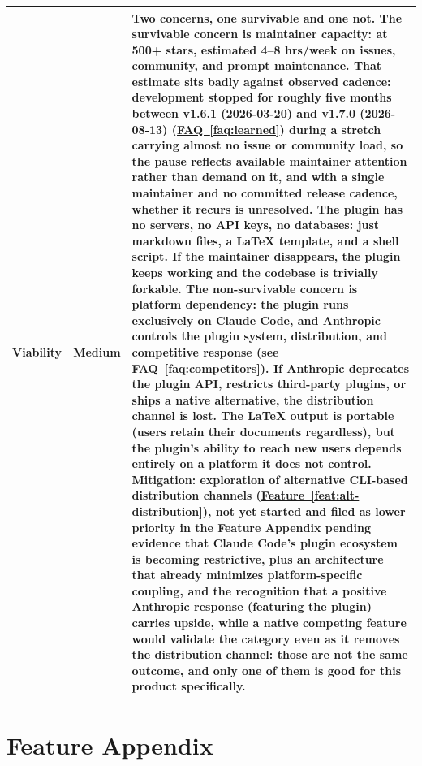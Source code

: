 \documentclass[11pt,letterpaper]{article}
\newcommand{\faqref}[1]{\hyperref[#1]{FAQ~\ref*{#1}}}
\newcommand{\featureref}[1]{\hyperref[#1]{Feature~\ref*{#1}}}
\begin{document}
\begin{tabularx}{\textwidth}{@{} l l X @{}}
Viability  & \textcolor{RiskAmber}{Medium} & Two concerns, one survivable and one not. The survivable concern is maintainer capacity: at 500+ stars, estimated 4--8 hrs/week on issues, community, and prompt maintenance. That estimate sits badly against observed cadence: development stopped for roughly five months between v1.6.1 (2026-03-20) and v1.7.0 (2026-08-13) (\faqref{faq:learned}) during a stretch carrying almost no issue or community load, so the pause reflects available maintainer attention rather than demand on it, and with a single maintainer and no committed release cadence, whether it recurs is unresolved. The plugin has no servers, no API keys, no databases: just markdown files, a LaTeX template, and a shell script. If the maintainer disappears, the plugin keeps working and the codebase is trivially forkable. The non-survivable concern is platform dependency: the plugin runs exclusively on Claude Code, and Anthropic controls the plugin system, distribution, and competitive response (see \faqref{faq:competitors}). If Anthropic deprecates the plugin API, restricts third-party plugins, or ships a native alternative, the distribution channel is lost. The LaTeX output is portable (users retain their documents regardless), but the plugin's ability to reach new users depends entirely on a platform it does not control. Mitigation: exploration of alternative CLI-based distribution channels (\featureref{feat:alt-distribution}), not yet started and filed as lower priority in the Feature Appendix pending evidence that Claude Code's plugin ecosystem is becoming restrictive, plus an architecture that already minimizes platform-specific coupling, and the recognition that a positive Anthropic response (featuring the plugin) carries upside, while a native competing feature would validate the category even as it removes the distribution channel: those are not the same outcome, and only one of them is good for this product specifically. \\
\bottomrule
\end{tabularx}
\renewcommand{\arraystretch}{1.0}


\newpage
\section*{Feature Appendix}
\end{document}
